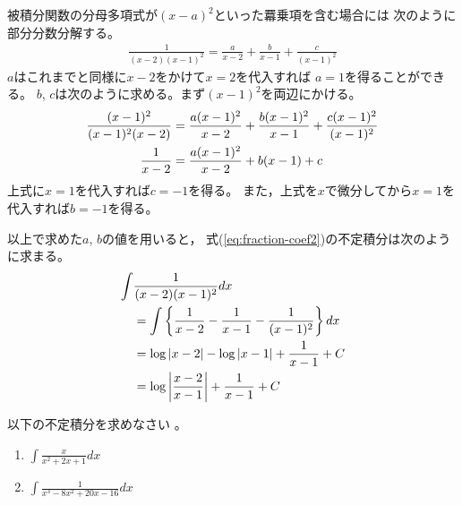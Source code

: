 \documentclass[twocolumn,11pt]{jarticle}
\begin{document}
\comment
被積分関数の分母多項式が$(x-a)^2$といった羃乗項を含む場合には
次のように部分分数分解する。
\begin{align}
  \label{eq:fraction-coef2}
  \frac{1}{(x-2)(x-1)^2}
  =\frac{a}{x-2}+\frac{b}{x-1}+\frac{c}{(x-1)^2}
\end{align}
$a$はこれまでと同様に$x-2$をかけて$x=2$を代入すれば
$a=1$を得ることができる。
$b$, $c$は次のように求める。まず$(x-1)^2$を両辺にかける。
\begin{align}
  \frac{(x-1)^2}{(x-1)^2(x-2)}
  &=\frac{a(x-1)^2}{x-2}+\frac{b(x-1)^2}{x-1}+\frac{c(x-1)^2}{(x-1)^2}\notag\\
  \frac{1}{x-2}
  &=\frac{a(x-1)^2}{x-2}+b(x-1)+c\notag
\end{align}
上式に$x=1$を代入すれば$c=-1$を得る。
また，上式を$x$で微分してから$x=1$を代入すれば$b=-1$を得る。

以上で求めた$a$, $b$の値を用いると，
式(\ref{eq:fraction-coef2})の不定積分は次のように求まる。
\begin{align}
  \int&\frac{1}{(x-2)(x-1)^2}dx\notag\\
  &=\int\left\{\frac{1}{x-2}-\frac{1}{x-1}-\frac{1}{(x-1)^2}\right\}dx\notag\\
  &=\log|x-2|-\log|x-1|+\frac{1}{x-1}+C\notag\\
  &=\log \left|\frac{x-2}{x-1}\right|+\frac{1}{x-1}+C\notag
\end{align}

\exercise
以下の不定積分を求めなさい
。
\begin{enumerate}
\item \label{iitem:x/(x^x+2x+1)}$\displaystyle\int\frac{x}{x^2+2x+1}dx$
\item \label{iitem:1/(x^3-8x^2+20x-16)}$\displaystyle\int\frac{1}{x^3-8x^2+20x-16}dx$
\end{enumerate}
\end{document}
